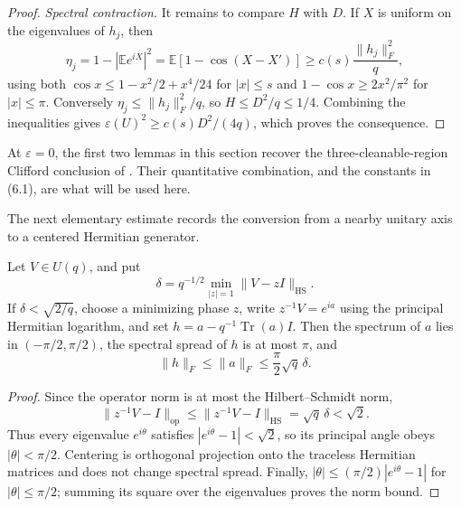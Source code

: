 \begin{proof}
\medskip\noindent\emph{Spectral contraction.}
It remains to compare \(H\) with \(D\).  If \(X\) is uniform on the
eigenvalues of \(h_j\), then
\[
 \eta_j=1-|\mathbb E e^{iX}|^2
 =\mathbb E[1-\cos(X-X')]
 \geq c(s)\frac{\lVert h_j\rVert_F^2}{q},
\]
using both \(\cos x\leq1-x^2/2+x^4/24\) for \(|x|\leq s\) and
\(1-\cos x\geq2x^2/\pi^2\) for \(|x|\leq\pi\).  Conversely
\(\eta_j\leq\lVert h_j\rVert_F^2/q\), so \(H\leq D^2/q\leq1/4\).
Combining the inequalities gives
\(\varepsilon(U)^2\geq c(s)D^2/(4q)\), which proves the consequence.
\end{proof}

At \(\varepsilon=0\), the first two lemmas in this section recover the
three-cleanable-region Clifford conclusion of
\cite[Lemma~5]{PastawskiYoshida2015}.  Their quantitative combination, and
the constants in (6.1), are what will be used here.

The next elementary estimate records the conversion from a nearby unitary
axis to a centered Hermitian generator.

\begin{lemma}
\label{lem:chord-centered-logarithm}
Let \(V\in U(q)\), and put
\[
 \delta=q^{-1/2}\min_{|z|=1}\lVert V-zI\rVert_{\mathrm{HS}}.
\]
If \(\delta<\sqrt{2/q}\), choose a minimizing phase \(z\), write
\(z^{-1}V=e^{ia}\) using the principal Hermitian logarithm, and set
\(h=a-q^{-1}\operatorname{Tr}(a)I\).  Then the spectrum of \(a\) lies in
\((-\pi/2,\pi/2)\), the spectral spread of \(h\) is at most \(\pi\), and
\[
 \lVert h\rVert_F\leq\lVert a\rVert_F
 \leq\frac{\pi}{2}\sqrt q\,\delta .
\]
\end{lemma}

\begin{proof}
Since the operator norm is at most the Hilbert--Schmidt norm,
\[
 \lVert z^{-1}V-I\rVert_{\mathrm{op}}
 \leq\lVert z^{-1}V-I\rVert_{\mathrm{HS}}
 =\sqrt q\,\delta<\sqrt2.
\]
Thus every eigenvalue \(e^{i\theta}\) satisfies
\(|e^{i\theta}-1|<\sqrt2\), so its principal angle obeys
\(|\theta|<\pi/2\).  Centering is orthogonal projection onto the traceless
Hermitian matrices and does not change spectral spread.  Finally,
\(|\theta|\leq(\pi/2)|e^{i\theta}-1|\) for \(|\theta|\leq\pi/2\); summing
its square over the eigenvalues proves the norm bound.
\end{proof}

